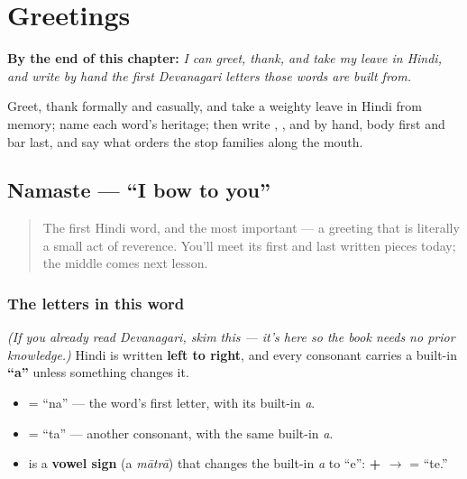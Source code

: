 
\chapter{Greetings}
\label{ch:greetings}

\begin{chapteropening}
\textbf{By the end of this chapter:} \emph{I can greet, thank, and take my leave in Hindi, and write by hand the first Devanagari letters those words are built from.}

Greet, thank formally and casually, and take a weighty leave in Hindi from memory; name each word's heritage; then write , ,  and  by hand, body first and bar last, and say what orders the stop families along the mouth.
\end{chapteropening}

\section[\texorpdfstring{\hi{नमस्ते} (namaste)}{नमस्ते (namaste)}]{Namaste — \textquotedblleft{}I bow to you\textquotedblright{}}

\label{lesson:HI-C01-namaste}



\begin{quote}
The first Hindi word, and the most important — a greeting that is literally a small act of reverence. You'll meet its first and last written pieces today; the middle comes next lesson.
\end{quote}

\subsection*{The letters in this word}
\emph{(If you already read Devanagari, skim this — it's here so the book needs no prior knowledge.)} Hindi is written \textbf{left to right}, and every consonant carries a built-in \textbf{\textquotedblleft{}a\textquotedblright{}} unless something changes it.

\begin{itemize}
\raggedright
  \item \textbf{} = \textquotedblleft{}na\textquotedblright{} — the word's first letter, with its built-in \emph{a}.
  \item \textbf{} = \textquotedblleft{}ta\textquotedblright{} — another consonant, with the same built-in \emph{a}.
  \item \textbf{} is a \textbf{vowel sign} (a \emph{mātrā}) that changes the built-in \emph{a} to \textquotedblleft{}e\textquotedblright{}: \textbf{ +  $\to$ } = \textquotedblleft{}te.\textquotedblright{}
\end{itemize}

